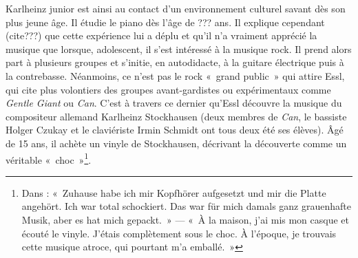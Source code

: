 \documentclass[a4paper,12pt]{article}
\newcommand{\guill}[1]{«~#1~»}
\newcommand{\zitat}[2]{\#Citation(#2)\#}
\begin{document}
Karlheinz junior est ainsi au contact d'un environnement culturel savant dès son plus jeune âge. Il étudie le piano dès l'âge de ??? ans. Il explique cependant (cite???) que cette expérience lui a déplu et qu'il n'a vraiment apprécié la musique que lorsque, adolescent, il s'est intéressé à la musique rock. Il prend alors part à plusieurs groupes et s'initie, en autodidacte, à la guitare électrique puis à la contrebasse. Néanmoins, ce n'est pas le rock \guill{grand public} qui attire Essl, qui cite plus volontiers des groupes avant-gardistes ou expérimentaux comme \emph{Gentle Giant} ou \emph{Can}. C'est à travers ce dernier qu'Essl découvre la musique du compositeur allemand Karlheinz Stockhausen (deux membres de \emph{Can}, le bassiste Holger Czukay et le claviériste Irmin Schmidt ont tous deux été ses élèves). Âgé de 15 ans, il achète un vinyle de Stockhausen, décrivant la découverte comme un véritable \guill{choc}\footnote{Dans \cite{OMNIA IN OMNIBUS: Behind the Scenes  ???}: \guill{Zuhause habe ich mir Kopfhörer aufgesetzt und mir die Platte angehört. Ich war total schockiert. Das war für mich damals ganz grauenhafte Musik, aber es hat mich gepackt.} --- \guill{À la maison, j'ai mis mon casque et écouté le vinyle. J'étais complètement sous le choc. À l'époque, je trouvais cette musique atroce, qui pourtant m'a emballé.}}.

\end{document}
